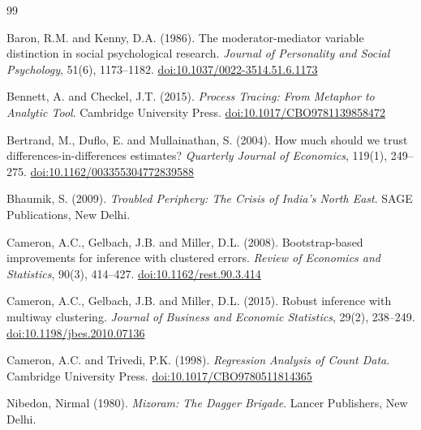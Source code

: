 \documentclass[12pt,a4paper]{article}
\begin{document}
\newpage
{\sloppy
\begin{thebibliography}{99}

Baron, R.M. and Kenny, D.A. (1986). The moderator-mediator variable distinction in social psychological research. \textit{Journal of Personality and Social Psychology}, 51(6), 1173--1182. \href{https://doi.org/10.1037/0022-3514.51.6.1173}{doi:10.1037/0022-3514.51.6.1173}

Bennett, A. and Checkel, J.T. (2015). \textit{Process Tracing: From Metaphor to Analytic Tool}. Cambridge University Press. \href{https://doi.org/10.1017/CBO9781139858472}{doi:10.1017/CBO9781139858472}

Bertrand, M., Duflo, E. and Mullainathan, S. (2004). How much should we trust differences-in-differences estimates? \textit{Quarterly Journal of Economics}, 119(1), 249--275. \href{https://doi.org/10.1162/003355304772839588}{doi:10.1162/003355304772839588}

Bhaumik, S. (2009). \textit{Troubled Periphery: The Crisis of India's North East}. SAGE Publications, New Delhi.

Cameron, A.C., Gelbach, J.B. and Miller, D.L. (2008). Bootstrap-based improvements for inference with clustered errors. \textit{Review of Economics and Statistics}, 90(3), 414--427. \href{https://doi.org/10.1162/rest.90.3.414}{doi:10.1162/rest.90.3.414}

Cameron, A.C., Gelbach, J.B. and Miller, D.L. (2015). Robust inference with multiway clustering. \textit{Journal of Business and Economic Statistics}, 29(2), 238--249. \href{https://doi.org/10.1198/jbes.2010.07136}{doi:10.1198/jbes.2010.07136}

Cameron, A.C. and Trivedi, P.K. (1998). \textit{Regression Analysis of Count Data}. Cambridge University Press. \href{https://doi.org/10.1017/CBO9780511814365}{doi:10.1017/CBO9780511814365}

Nibedon, Nirmal (1980). \textit{Mizoram: The Dagger Brigade}. Lancer Publishers, New Delhi.


\end{thebibliography}}
\end{document}
